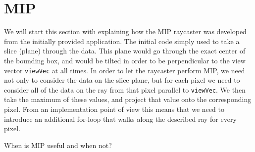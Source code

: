 
\section{MIP}\label{sec:mip}
We will start this section with explaining how the MIP raycaster was developed from the initially provided application. The initial code simply used to take a slice (plane) through the data. This plane would go through the exact center of the bounding box, and would be tilted in order to be perpendicular to the view vector \texttt{viewVec} at all times. In order to let the raycaster perform MIP, we need not only to consider the data on the slice plane, but for each pixel we need to consider all of the data on the ray from that pixel parallel to \texttt{viewVec}. We then take the maximum of these values, and project that value onto the corresponding pixel. From an implementation point of view this means that we need to introduce an additional for-loop that walks along the described ray for every pixel.


When is MIP useful and when not?\todo{!}


